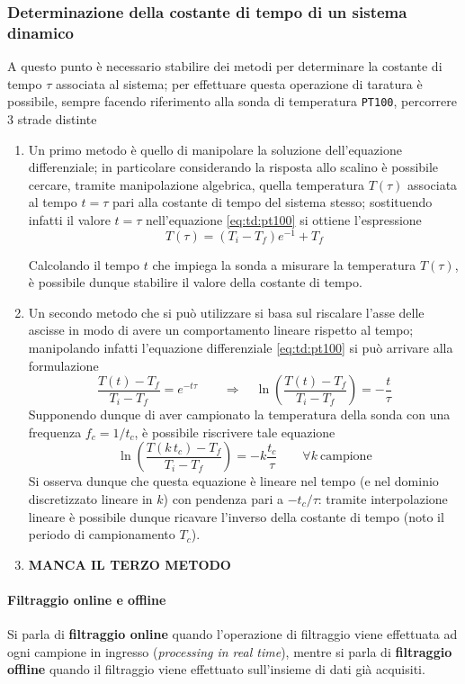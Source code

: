 		\subsubsection{Determinazione della costante di tempo di un sistema dinamico}
		A questo punto è necessario stabilire dei metodi per determinare la costante di tempo $\tau$ associata al sistema; per effettuare questa operazione di taratura è possibile, sempre facendo riferimento alla sonda di temperatura \texttt{PT100}, percorrere 3 strade distinte
		\begin{enumerate}
			\item Un primo metodo è quello di manipolare la soluzione dell'equazione differenziale; in particolare considerando la risposta allo scalino è possibile cercare, tramite manipolazione algebrica, quella temperatura $T(\tau)$ associata al tempo $t = \tau$ pari alla costante di tempo del sistema stesso; sostituendo infatti il valore $t= \tau$ nell'equazione \ref{eq:td:pt100} si ottiene l'espressione
			\[ T(\tau ) = \left(T_i- T_f\right)e^{-1} + T_f \]
			
			Calcolando il tempo $t$ che impiega la sonda a misurare la temperatura $T(\tau)$, è possibile dunque stabilire il valore della costante di tempo.
			
			\item Un secondo metodo che si può utilizzare si basa sul riscalare l'asse delle ascisse in modo di avere un comportamento lineare rispetto al tempo; manipolando infatti l'equazione differenziale \eqref{eq:td:pt100} si può arrivare alla formulazione
			\[ \frac{T(t) - T_f}{T_i-T_f} = e^{-t\tau} \qquad \Rightarrow \quad \ln \left( \frac{T(t) - T_f}{T_i-T_f}\right) = - \frac t \tau \]
			Supponendo dunque di aver campionato la temperatura della sonda con una frequenza $f_c = 1/t_c$, è possibile riscrivere tale equazione 
			\[ \ln \left( \frac{T(k \, t_c) - T_f}{T_i-T_f}\right) = - k \frac {t_c} \tau \qquad \forall k \ \textrm{campione}  \]
			Si osserva dunque che questa equazione è lineare nel tempo (e nel dominio discretizzato lineare in $k$) con pendenza pari a $-t_c/\tau$: tramite interpolazione lineare è possibile dunque ricavare l'inverso della costante di tempo (noto il periodo di campionamento $T_c$).
			
			\item \textbf{MANCA IL TERZO METODO}
			
		\end{enumerate}
	

	\paragraph{Filtraggio online e offline} Si parla di \textbf{filtraggio online} quando l'operazione di filtraggio viene effettuata ad ogni campione in ingresso (\textit{processing in real time}), mentre si parla di \textbf{filtraggio offline} quando il filtraggio viene effettuato sull'insieme di dati già acquisiti.
	
